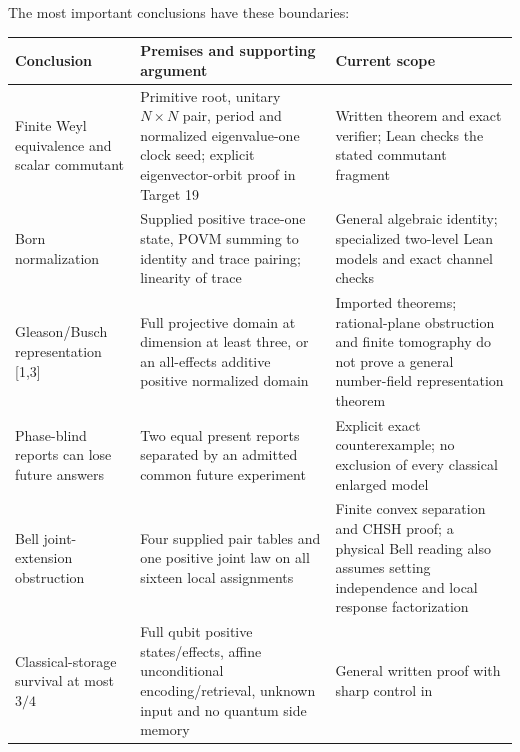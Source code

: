 \documentclass[
  11pt,
]{article}
\begin{document}
The most important conclusions have these boundaries:

\begin{longtable}[]{@{}
  >{\raggedright\arraybackslash}p{}
  >{\raggedright\arraybackslash}p{}
  >{\raggedright\arraybackslash}p{}@{}}
\toprule\noalign{}
\begin{minipage}[b]{\linewidth}\raggedright
Conclusion
\end{minipage} & \begin{minipage}[b]{\linewidth}\raggedright
Premises and supporting argument
\end{minipage} & \begin{minipage}[b]{\linewidth}\raggedright
Current scope
\end{minipage} \\
\midrule\noalign{}
\endhead
\bottomrule\noalign{}
\endlastfoot
Finite Weyl equivalence and scalar commutant & Primitive root, unitary
\(N \times N\) pair, period and normalized eigenvalue-one clock seed;
explicit eigenvector-orbit proof in Target 19 & Written theorem and
exact verifier; Lean checks the stated commutant fragment \\
Born normalization & Supplied positive trace-one state, POVM summing to
identity and trace pairing; linearity of trace & General algebraic
identity; specialized two-level Lean models and exact channel checks \\
Gleason\allowbreak{}/\allowbreak{}Busch representation {[}1,3{]} & Full
projective domain at dimension at least three, or an all-effects
additive positive normalized domain & Imported theorems; rational-plane
obstruction and finite tomography do not prove a general number-field
representation theorem \\
Phase-blind reports can lose future answers & Two equal present reports
separated by an admitted common future experiment & Explicit exact
counterexample; no exclusion of every classical enlarged model \\
Bell joint-extension obstruction & Four supplied pair tables and one
positive joint law on all sixteen local assignments & Finite convex
separation and CHSH proof; a physical Bell reading also assumes setting
independence and local response factorization \\
Classical-storage survival at most \(3/4\) & Full qubit positive
states/effects, affine unconditional encoding/retrieval, unknown input
and no quantum side memory & General written proof with sharp control in

\end{longtable}
\end{document}
